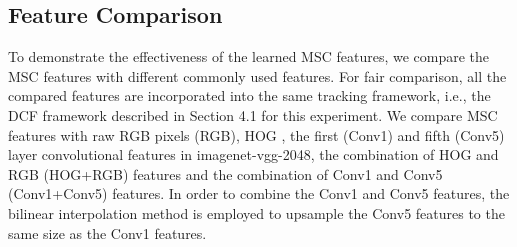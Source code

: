 \documentclass[runningheads]{llncs}
\begin{document}
\subsection{Feature Comparison}



To demonstrate the effectiveness of the learned MSC features, we compare the MSC features with different commonly used features. For fair comparison, all the compared features are incorporated into the same tracking framework, i.e., the DCF framework described in Section 4.1 for this experiment. We compare MSC features with raw RGB pixels (RGB), HOG \cite{HOG}, the first (Conv1) and fifth (Conv5) layer convolutional features in imagenet-vgg-2048, the combination of HOG and RGB (HOG+RGB) features and the combination of Conv1 and Conv5 (Conv1+Conv5) features. In order to combine the Conv1 and Conv5 features, the bilinear interpolation method is employed to upsample the Conv5 features to the same size as the Conv1 features.
\end{document}
